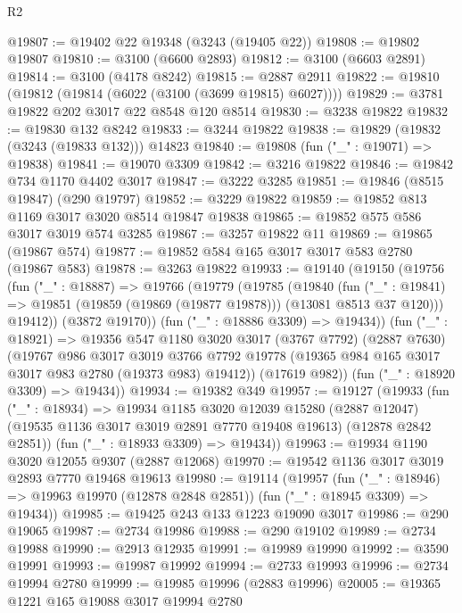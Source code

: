 \begin{lexlean}{R2}
\begin{coremodule}
@19807 := @19402 @22 @19348 (@3243 (@19405 @22))
@19808 := @19802 @19807
@19810 := @3100 (@6600 @2893)
@19812 := @3100 (@6603 @2891)
@19814 := @3100 (@4178 @8242)
@19815 := @2887 @2911
@19822 := @19810 (@19812 (@19814 (@6022 (@3100 (@3699 @19815) @6027))))
@19829 := @3781 @19822 @202 @3017 @22 @8548 @120 @8514
@19830 := @3238 @19822
@19832 := @19830 @132 @8242
@19833 := @3244 @19822
@19838 := @19829 (@19832 (@3243 (@19833 @132))) @14823
@19840 := @19808 (fun ("_" : @19071) => @19838)
@19841 := @19070 @3309
@19842 := @3216 @19822
@19846 := @19842 @734 @1170 @4402 @3017
@19847 := @3222 @3285
@19851 := @19846 (@8515 @19847) (@290 @19797)
@19852 := @3229 @19822
@19859 := @19852 @813 @1169 @3017 @3020 @8514 @19847 @19838
@19865 := @19852 @575 @586 @3017 @3019 @574 @3285
@19867 := @3257 @19822 @11
@19869 := @19865 (@19867 @574)
@19877 := @19852 @584 @165 @3017 @3017 @583 @2780 (@19867 @583)
@19878 := @3263 @19822
@19933 := @19140
    (@19150
      (@19756
        (fun ("_" : @18887) =>
        @19766
          (@19779
            (@19785
              (@19840
                (fun ("_" : @19841) =>
                @19851 (@19859 (@19869 (@19877 @19878))) (@13081 @8513 @37 @120)))
              @19412))
          (@3872 @19170))
        (fun ("_" : @18886 @3309) => @19434))
      (fun ("_" : @18921) =>
      @19356
        @547
        @1180
        @3020
        @3017
        (@3767 @7792)
        (@2887 @7630)
        (@19767
          @986
          @3017
          @3019
          @3766
          @7792
          @19778
          (@19365 @984 @165 @3017 @3017 @983 @2780 (@19373 @983) @19412))
        (@17619 @982))
      (fun ("_" : @18920 @3309) => @19434))
@19934 := @19382 @349
@19957 := @19127
    (@19933
      (fun ("_" : @18934) =>
      @19934
        @1185
        @3020
        @12039
        @15280
        (@2887 @12047)
        (@19535 @1136 @3017 @3019 @2891 @7770 @19408 @19613)
        (@12878 @2842 @2851))
      (fun ("_" : @18933 @3309) => @19434))
@19963 := @19934 @1190 @3020 @12055 @9307 (@2887 @12068)
@19970 := @19542 @1136 @3017 @3019 @2893 @7770 @19468 @19613
@19980 := @19114
    (@19957
      (fun ("_" : @18946) => @19963 @19970 (@12878 @2848 @2851))
      (fun ("_" : @18945 @3309) => @19434))
@19985 := @19425 @243 @133 @1223 @19090 @3017
@19986 := @290 @19065
@19987 := @2734 @19986
@19988 := @290 @19102
@19989 := @2734 @19988
@19990 := @2913 @12935
@19991 := @19989 @19990
@19992 := @3590 @19991
@19993 := @19987 @19992
@19994 := @2733 @19993
@19996 := @2734 @19994 @2780
@19999 := @19985 @19996 (@2883 @19996)
@20005 := @19365 @1221 @165 @19088 @3017 @19994 @2780

\end{coremodule}
\end{lexlean}
